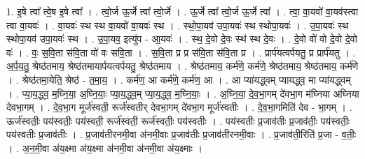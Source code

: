 \documentclass[17pt]{extarticle}
\begin{document}
1. इ॒षे त्वा᳚ त्वे॒ष इ॒षे त्वा᳚ । . त्वो॒र्ज ऊ॒र्जे त्वा᳚ त्वो॒र्जे । . ऊ॒र्जे त्वा᳚ त्वो॒र्ज ऊ॒र्जे त्वा᳚ । . त्वा॒ वा॒यवो॑ वा॒यव॑स्त्वा त्वा वा॒यवः॑ । . वा॒यवः॑ स्थ स्थ वा॒यवो॑ वा॒यवः॑ स्थ । . स्थो॒पा॒यव॑ उपा॒यवः॑ स्थ स्थोपा॒यवः॑ । . उ॒पा॒यवः॑ स्थ स्थोपा॒यव॑ उपा॒यवः॑ स्थ । . उ॒पा॒यव॒ इत्यु॑प - आ॒यवः॑ । . स्थ॒ दे॒वो दे॒वः स्थ॑ स्थ दे॒वः । . दे॒वो वो॑ वो दे॒वो दे॒वो वः॑ । . वः॒ स॒वि॒ता स॑वि॒ता वो॑ वः सवि॒ता । . स॒वि॒ता प्र प्र स॑वि॒ता स॑वि॒ता प्र । . प्रार्प॑यत्वर्पयतु॒ प्र प्रार्प॑यतु । . अ॒र्प॒य॒तु॒ श्रेष्ठ॑तमाय॒ श्रेष्ठ॑तमायार्पयत्वर्पयतु॒ श्रेष्ठ॑तमाय । . श्रेष्ठ॑तमाय॒ कर्म॑णे॒ कर्म॑णे॒ श्रेष्ठ॑तमाय॒ श्रेष्ठ॑तमाय॒ कर्म॑णे । . श्रेष्ठ॑तमा॒येति॒ श्रेष्ठ॑ - त॒मा॒य॒ । . कर्म॑ण॒ आ कर्म॑णे॒ कर्म॑ण॒ आ । . आ प्या॑यद्ध्वम् प्यायद्ध्व॒ मा प्या॑यद्ध्वम् । . प्या॒य॒द्ध्व॒ म॒घ्नि॒या॒ अ॒घ्नि॒याः॒ प्या॒य॒द्ध्व॒म् प्या॒य॒द्ध्व॒ म॒घ्नि॒याः॒ । . अ॒घ्नि॒या॒ दे॒व॒भा॒गम् दे॑वभा॒ग म॑घ्निया अघ्निया देवभा॒गम् । . दे॒व॒भा॒ग मूर्ज॑स्वती॒ रूर्ज॑स्वतीर् देवभा॒गम् दे॑वभा॒ग मूर्ज॑स्वतीः । . दे॒व॒भा॒गमिति॑ देव - भा॒गम् । . ऊर्ज॑स्वतीः॒ पय॑स्वतीः॒ पय॑स्वती॒ रूर्ज॑स्वती॒ रूर्ज॑स्वतीः॒ पय॑स्वतीः । . पय॑स्वतीः प्र॒जाव॑तीः प्र॒जाव॑तीः॒ पय॑स्वतीः॒ पय॑स्वतीः प्र॒जाव॑तीः । . प्र॒जाव॑तीरनमी॒वा अ॑नमी॒वाः प्र॒जाव॑तीः प्र॒जाव॑तीरनमी॒वाः । . प्र॒जाव॑ती॒रिति॑ प्र॒जा - व॒तीः॒ । . अ॒न॒मी॒वा अ॑य॒क्ष्मा अ॑य॒क्ष्मा अ॑नमी॒वा अ॑नमी॒वा अ॑य॒क्ष्माः । \newline
\end{document}
